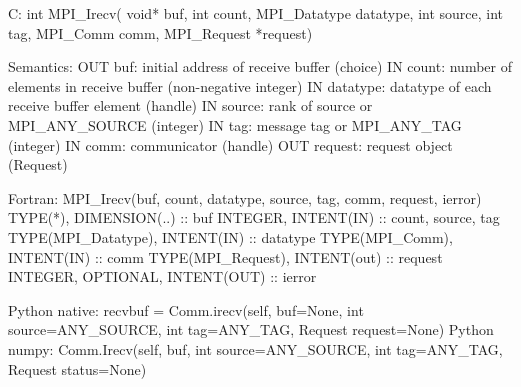C:
int MPI_Irecv(
  void* buf, int count, MPI_Datatype datatype,
  int source, int tag, MPI_Comm comm, MPI_Request *request)

Semantics:
OUT buf: initial address of receive buffer (choice)
IN count: number of elements in receive buffer (non-negative integer)
IN datatype: datatype of each receive buffer element (handle)
IN source: rank of source or MPI_ANY_SOURCE (integer)
IN tag: message tag or MPI_ANY_TAG (integer)
IN comm: communicator (handle)
OUT request: request object (Request)

Fortran:
MPI_Irecv(buf, count, datatype, source, tag, comm, request, ierror)
TYPE(*), DIMENSION(..) :: buf
INTEGER, INTENT(IN) :: count, source, tag
TYPE(MPI_Datatype), INTENT(IN) :: datatype
TYPE(MPI_Comm), INTENT(IN) :: comm
TYPE(MPI_Request), INTENT(out) :: request
INTEGER, OPTIONAL, INTENT(OUT) :: ierror

Python native:
recvbuf = Comm.irecv(self, buf=None, int source=ANY_SOURCE, int tag=ANY_TAG,
    Request request=None)
Python numpy:
Comm.Irecv(self, buf, int source=ANY_SOURCE, int tag=ANY_TAG,
    Request status=None)
